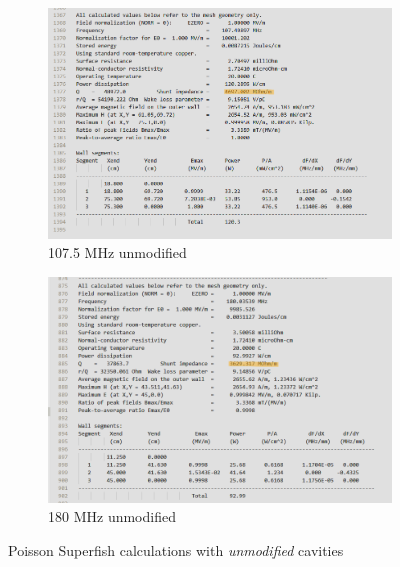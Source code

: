 \documentclass{article}
\begin{document}
\begin{figure}[H]
    \centering
    \begin{subfigure}{.5\textwidth}
      \centering
      \includegraphics[width=0.97\linewidth]{../../../figures/superfish/superfish107_z_highlighted.png}
      \caption{107.5 MHz unmodified}
    \end{subfigure}%
    \begin{subfigure}{.5\textwidth}
      \centering
      \includegraphics[width=0.99\linewidth]{../../../figures/superfish/superfish180_z_highlighted.png}
      \caption{180 MHz unmodified}
    \end{subfigure}
    \caption{Poisson Superfish calculations with \textit{unmodified} cavities}
    \label{fig:107_cavity_shunt_diff}
\end{figure}
    
\end{document}
